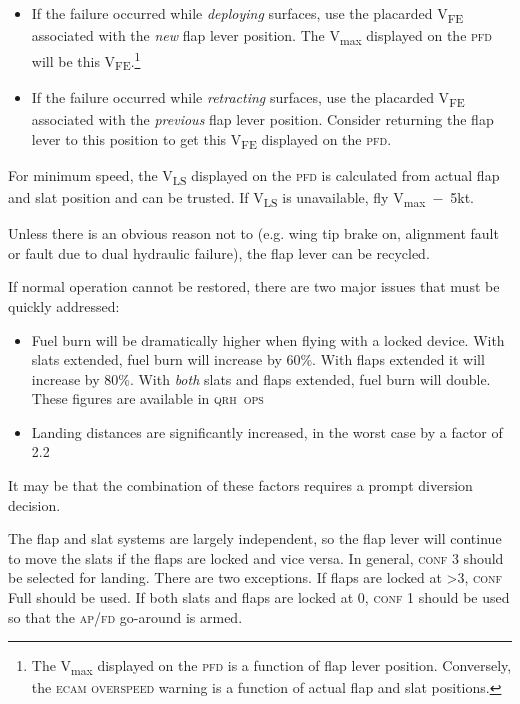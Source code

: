 \documentclass[a5paper,11pt,twoside]{book}
\newcommand{\ac}[1]{{\scshape\MakeLowercase{#1}}}
\newcommand{\cphrase}[1]{\ac{#1}}
\newcommand{\V}[1]{V\textsubscript{#1}}
\begin{document}
\begin{itemize}
\item If the failure occurred while \emph{deploying} surfaces, use the placarded
  \V{FE} associated with the \emph{new} flap lever position. The \V{max}
  displayed on the \ac{PFD} will be this \V{FE}.\footnote{The \V{max} displayed
  on the \ac{PFD} is a function of flap lever position. Conversely, the
  \ac{ecam} \ac{overspeed} warning is a function of actual flap and slat
  positions.}
\item If the failure occurred while \emph{retracting} surfaces, use the
  placarded \V{FE} associated with the \emph{previous} flap lever
  position. Consider returning the flap lever to this position to get this
  \V{FE} displayed on the \ac{PFD}.
\end{itemize}

For minimum speed, the \V{LS} displayed on the \ac{PFD} is calculated from
actual flap and slat position and can be trusted. If \V{LS} is unavailable, fly
\V{max}~$-$~5kt.

Unless there is an obvious reason not to (e.g. wing tip brake on, alignment
fault or fault due to dual hydraulic failure), the flap lever can be recycled.

If normal operation cannot be restored, there are two major issues that must be
quickly addressed:

\begin{itemize}
\item Fuel burn will be dramatically higher when flying with a locked
  device. With slats extended, fuel burn will increase by 60\%. With flaps
  extended it will increase by 80\%. With \emph{both} slats and flaps extended,
  fuel burn will double. These figures are available in \cphrase{QRH~OPS}
\item Landing distances are significantly increased, in the worst case by a
  factor of 2.2
\end{itemize}

It may be that the combination of these factors requires a prompt diversion
decision.

The flap and slat systems are largely independent, so the flap lever will
continue to move the slats if the flaps are locked and vice versa. In general,
\ac{conf} 3 should be selected for landing. There are two exceptions. If flaps
are locked at >3, \ac{conf} Full should be used. If both slats and flaps are
locked at 0, \ac{conf} 1 should be used so that the \ac{AP/FD} go-around is
armed.
\end{document}
